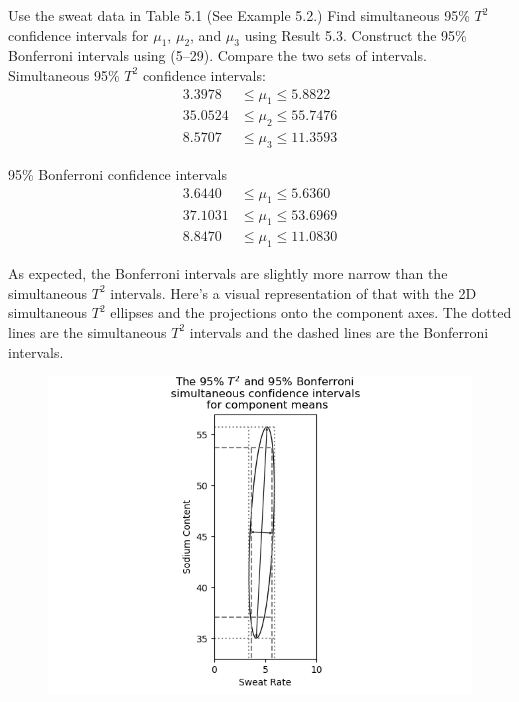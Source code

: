 Use the sweat data in Table 5.1 (See Example 5.2.) Find simultaneous 95\% $T^{2}$ confidence
intervals for $\mu_{1}$, $\mu_{2}$, and $\mu_{3}$ using Result 5.3. Construct the 95\% Bonferroni intervals
using (5--29). Compare the two sets of intervals.
\newline
\newline
Simultaneous 95\% $T^{2}$ confidence intervals:
\begin{align*}
    3.3978  &\leq \mu_{1} \leq  5.8822 \\
    35.0524 &\leq \mu_{2} \leq 55.7476 \\
    8.5707  &\leq \mu_{3} \leq 11.3593
\end{align*}

95\% Bonferroni confidence intervals
\begin{align*}
    3.6440  &\leq \mu_{1} \leq 5.6360 \\
    37.1031 &\leq \mu_{1} \leq 53.6969 \\
    8.8470  &\leq \mu_{1} \leq 11.0830
\end{align*}

As expected, the Bonferroni intervals are slightly more narrow than the simultaneous $T^{2}$ intervals.
Here's a visual representation of that with the 2D simultaneous $T^{2}$ ellipses and the projections onto the component axes. The dotted lines are the simultaneous $T^{2}$ intervals and the dashed lines are the Bonferroni intervals.

\begin{figure}[H]
    \centering
    \includegraphics[scale=0.75]{./python/chapter-5/Question-5-7-CI-Sweat-Sodium.png}
\end{figure}

